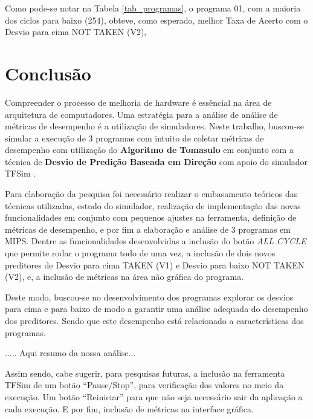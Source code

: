 \documentclass[12pt]{article}
\begin{document}
Como pode-se notar na Tabela \ref{tab_programas}, o programa 01, com a maioria dos ciclos para baixo (254), obteve, como esperado, melhor Taxa de Acerto com o Desvio para cima NOT TAKEN (V2),

\section{Conclusão}\label{sec:figs}

Compreender o processo de melhoria de hardware é essêncial na área de arquitetura de computadores. Uma estratégia para a análise de análise de métricas de desempenho é a utilização de simuladores. Neste trabalho, buscou-se simular a execução de 3 programas com intuito de coletar métricas de desempenho com utilização do \textbf{Algoritmo de Tomasulo} em conjunto com a  técnica de \textbf{Desvio de Predição Baseada em Direção} com apoio  do simulador TFSim \cite{lucas:2019}.

Para elaboração da pesquisa foi necessário realizar o embasamento teóricos das técnicas utilizadas, estudo do simulador, realização de implementação das novas funcionalidades em conjunto com pequenos ajustes na ferramenta, definição de métricas de desempenho, e por fim a elaboração e análise de 3 programas em MIPS. Dentre as funcionalidades desenvolvidas a inclusão do botão \textit{ALL CYCLE} que permite rodar o programa todo de uma vez, a inclusão de dois novos preditores  de Desvio para cima TAKEN (V1) e Desvio para baixo NOT TAKEN (V2), e, a inclusão de métricas na área não gráfica do programa.

Deste modo, buscou-se no desenvolvimento dos programas explorar os desvios para cima e para baixo de modo a garantir uma análise adequada do desempenho dos preditores. Sendo que este desempenho está relacionado a características dos programas.

..... Aqui resumo da nossa análise...

Assim sendo, cabe sugerir, para pesquisas futuras, a inclusão na ferramenta TFSim de um botão     ``Pause/Stop'', para verificação dos valores no meio da execução. Um botão ``Reiniciar'' para que não seja necessário sair da aplicação a cada execução. E por fim, inclusão de métricas na interface gráfica.



\end{document}

